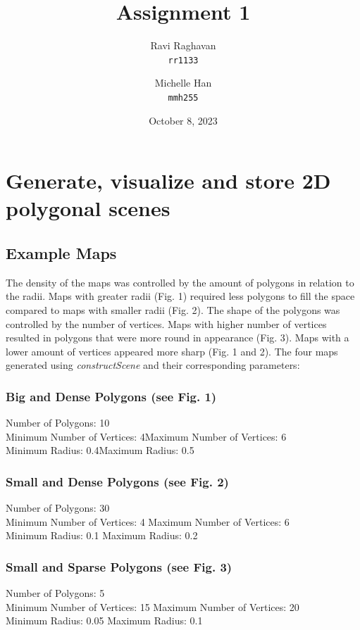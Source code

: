\documentclass{article}
\title{Assignment 1}
\date{October 8, 2023}
\author{
  Ravi Raghavan\\
  \texttt{rr1133}
  \and
  Michelle Han\\
  \texttt{mmh255}
}
\begin{document}
\maketitle
\section{Generate, visualize and store 2D polygonal scenes}

\subsection{Example Maps}
The density of the maps was controlled by the amount of polygons in relation to the radii. Maps with greater radii (Fig. 1) required less polygons to fill the space compared to maps with smaller radii (Fig. 2). The shape of the polygons was controlled by the number of vertices. Maps with higher number of vertices resulted in polygons that were more round in appearance (Fig. 3). Maps with a lower amount of vertices appeared more sharp (Fig. 1 and 2). The four maps generated using \textit{constructScene} and their corresponding parameters:
\subsubsection{Big and Dense Polygons (see Fig. 1)}
Number of Polygons: 10
\\Minimum Number of Vertices: 4\space\space\space\space\space\space\space  Maximum Number of Vertices: 6
\\Minimum Radius: 0.4\space\space\space\space\space\space\space\space\space\space\space \space\space\space\space\space\space \space\space\space\space  Maximum Radius: 0.5
\subsubsection{Small and Dense Polygons (see Fig. 2)}
Number of Polygons: 30 
\\Minimum Number of Vertices: 4 \space\space\space\space\space\space\space  Maximum Number of Vertices: 6
\\Minimum Radius: 0.1 \space\space\space\space\space\space\space\space \space\space\space\space \space\space\space\space\space\space \space\space\space Maximum Radius: 0.2
\subsubsection{Small and Sparse Polygons (see Fig. 3)}
Number of Polygons: 5
\\Minimum Number of Vertices: 15 \space\space\space\space\space\space\space Maximum Number of Vertices: 20
\\Minimum Radius: 0.05 \space\space\space\space\space\space\space\space\space\space\space\space \space\space\space\space\space\space \space\space\space Maximum Radius: 0.1
\end{document}
